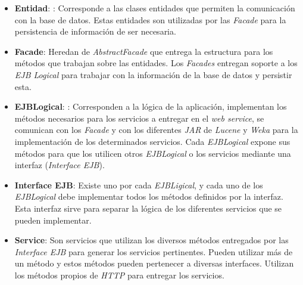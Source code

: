 \documentclass{memoria}
\begin{document}
\begin{itemize}
\item \textbf{Entidad}: : Corresponde a las clases entidades que permiten la comunicación con la base de datos. Estas entidades son utilizadas por las \textsl{Facade} para la persistencia de información de ser necesaria.

\item \textbf{Facade}: Heredan de \textsl{AbstractFacade} que entrega la estructura para los métodos que trabajan sobre las entidades. Los \textsl{Facades} entregan soporte a los \textsl{EJB Logical} para trabajar con la información de la base de datos y persistir esta.

\item \textbf{EJBLogical}: : Corresponden a la lógica de la aplicación, implementan los métodos necesarios para los servicios a entregar en el \textsl{web service}, se comunican con los \textsl{Facade} y con los diferentes \textsl{JAR} de \textsl{Lucene} y \textsl{Weka} para la implementación de los determinados servicios. Cada \textsl{EJBLogical} expone sus métodos para que los utilicen otros \textsl{EJBLogical} o los servicios mediante una interfaz (\textsl{Interface EJB}). 

\item \textbf{Interface EJB}: Existe uno por cada \textsl{EJBLigical}, y cada uno de los \textsl{EJBLogical} debe implementar todos los métodos definidos por la interfaz. Esta interfaz sirve para separar la lógica de los diferentes servicios que se pueden implementar.

\item \textbf{Service}: Son servicios que utilizan los diversos métodos entregados por las \textsl{Interface EJB} para generar los servicios pertinentes. Pueden utilizar más de un método y estos métodos pueden pertenecer a diversas interfaces. Utilizan los métodos propios de \textsl{HTTP} para entregar los servicios.
\end{itemize}
\end{document}
